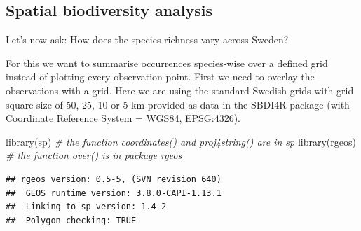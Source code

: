 \documentclass[
  10pt,
]{article}
\newenvironment{Shaded}{\begin{snugshade}}{\end{snugshade}}
\newcommand{\CommentTok}[1]{\textcolor[rgb]{0.56,0.35,0.01}{\textit{#1}}}
\newcommand{\FunctionTok}[1]{\textcolor[rgb]{0.00,0.00,0.00}{#1}}
\newcommand{\NormalTok}[1]{#1}
\begin{document}
\hypertarget{spatial-biodiversity-analysis}{%
\subsection{Spatial biodiversity analysis}\label{spatial-biodiversity-analysis}}

Let's now ask: How does the species richness vary across Sweden?

For this we want to summarise occurrences species-wise over a defined grid instead of plotting
every observation point. First we need to overlay the observations with a grid.
Here we are using the standard Swedish grids with grid square size of 50, 25, 10 or 5 km provided as
data in the SBDI4R package (with Coordinate Reference System = WGS84, EPSG:4326).

\begin{Shaded}
\begin{Highlighting}[]
\FunctionTok{library}\NormalTok{(sp) }\CommentTok{\# the function coordinates() and proj4string() are in sp}
\FunctionTok{library}\NormalTok{(rgeos) }\CommentTok{\# the function over() is in package rgeos}
\end{Highlighting}
\end{Shaded}

\begin{verbatim}
## rgeos version: 0.5-5, (SVN revision 640)
##  GEOS runtime version: 3.8.0-CAPI-1.13.1 
##  Linking to sp version: 1.4-2 
##  Polygon checking: TRUE
\end{verbatim}
\end{document}
